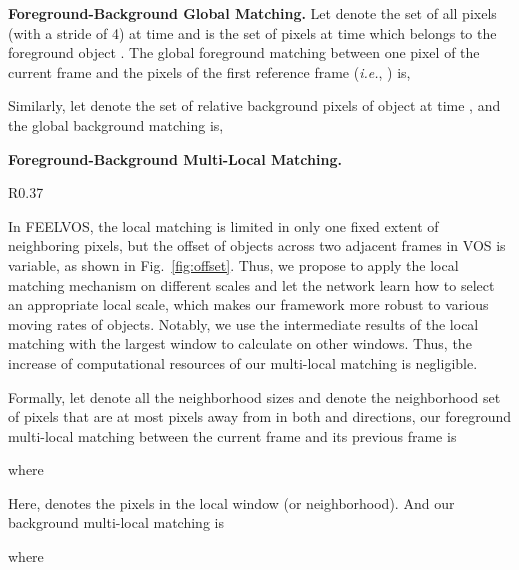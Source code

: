 \documentclass[runningheads]{llncs}
\def\ie{\emph{i.e.}}
\begin{document}
\noindent\textbf{Foreground-Background Global Matching.} Let  denote the set of all pixels (with a stride of 4) at time  and  is the set of pixels at time  which belongs to the foreground object . The global foreground matching between one pixel  of the current frame  and the pixels of the first reference frame (\ie, ) is,

Similarly, let  denote the set of relative background pixels of object  at time , and the global background matching is,


\noindent\textbf{Foreground-Background Multi-Local Matching.}

\setlength{\intextsep}{-10pt}
\begin{wrapfigure}[20]{R}{0.37\textwidth}
\center



\caption{The moving rate of objects across two adjacent frames is largely variable for different sequences. Examples are from YouTube-VOS~\cite{youtubevos}.}\label{fig:offset}
\end{wrapfigure}


\noindent In FEELVOS, the local matching is limited in only one fixed extent of neighboring pixels, but the offset of objects across two adjacent frames in VOS is variable, as shown in Fig.~\ref{fig:offset}. Thus, we propose to apply the local matching mechanism on different scales and let the network learn how to select an appropriate local scale, which makes our framework more robust to various moving rates of objects. Notably, we use the intermediate results of the local matching with the largest window to calculate on other windows. Thus, the increase of computational resources of our multi-local matching is negligible.

\setlength{\intextsep}{0pt}

Formally, let  denote all the neighborhood sizes and  denote the neighborhood set of pixels that are at most  pixels away from  in both  and  directions, our foreground multi-local matching between the current frame  and its previous frame  is

where

Here,  denotes the pixels in the local window (or neighborhood). And our background multi-local matching is

where
\end{document}
